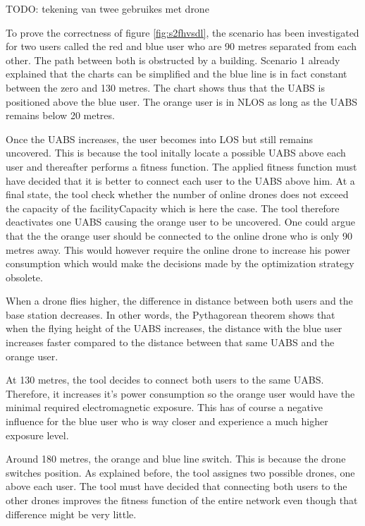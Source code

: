 TODO: tekening van twee gebruikes met drone

To prove the correctness of figure \ref{fig:s2fhvsdl}, the scenario has been investigated for two users called the red and blue user who 
are 90 metres separated from each other. The path between both is obstructed by a building.
Scenario 1 already explained that the charts can be simplified and the blue line is in fact constant between the zero and 130 metres.
The chart shows thus that the \gls{UABS} is positioned above the blue user. The orange user is in \gls{NLOS} as long as the \gls{UABS} remains below 20 metres.

Once the \gls{UABS} increases, the user becomes into \gls{LOS} but still remains uncovered. This is because the tool initally locate a possible 
\gls{UABS} above each user and thereafter performs a  fitness function. The applied fitness function must have decided that it is better to connect 
each user to the \gls{UABS} above him. At a final state, the tool check whether the number of online drones does not exceed the capacity of the facilityCapacity
which is here the case. The tool therefore deactivates one \gls{UABS} causing the orange user to be uncovered. One could argue that the 
the orange user should be connected to the online drone who is only 90 metres away. This would however require the online drone to increase his power consumption which 
would make the decisions made by the optimization strategy obsolete.

When a drone flies higher, the difference in distance between both users and the base station decreases. In other words, the Pythagorean theorem shows that when the flying height of the 
\gls{UABS} increases, the distance with the blue user increases faster compared to the distance between that same \gls{UABS} and the orange user.

At 130 metres, the tool decides to connect both users to the same UABS. Therefore, it increases it's power consumption so the orange user would  have the minimal 
required electromagnetic exposure. This has of course a negative influence for the blue user who is way closer and experience a much higher exposure level.

Around 180 metres, the  orange and blue line switch. This is because the drone switches position. As explained before, the tool assignes two possible drones, one above 
each user. The tool must have decided that connecting both users to the other drones improves the fitness function of the entire network even though that difference might be 
very little.



